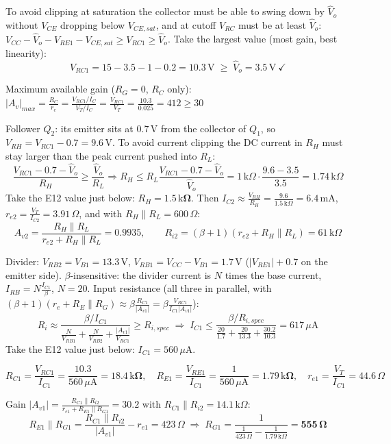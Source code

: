 \documentclass[11pt]{article}
\newcommand{\solstep}[2]{\par\medskip{\color{stepc}\textbf{Step #1 --- #2}}\par\nopagebreak}
\begin{document}
To avoid clipping at saturation the collector must be able to swing down by $\hat V_o$ without $V_{CE}$ dropping below $V_{CE,sat}$, and at cutoff $V_{RC}$ must be at least $\hat V_o$: $V_{CC} - \hat V_o - V_{RE1} - V_{CE,sat} \ge V_{RC1} \ge \hat V_o$. Take the largest value (most gain, best linearity): \[V_{RC1} = 15 - 3.5 - 1 - 0.2 = 10.3\,\mathrm{V} \;\ge\; \hat V_o = 3.5\,\mathrm{V}\ \checkmark\]

Maximum available gain ($R_G=0$, $R_C$ only): $|A_v|_{max} = \frac{R_C}{r_e} = \frac{V_{RC1}/I_C}{V_T/I_C} = \frac{V_{RC1}}{V_T} = \frac{10.3}{0.025} = 412 \ge 30$ \checkmark

Follower $Q_{2}$: its emitter sits at $0.7$\,V from the collector of $Q_{1}$, so $V_{RH} = V_{RC1} - 0.7 = 9.6\,\mathrm{V}$. To avoid current clipping the DC current in $R_H$ must stay larger than the peak current pushed into $R_L$: \[\frac{V_{RC1} - 0.7 - \hat V_o}{R_H} \ge \frac{\hat V_o}{R_L} \Rightarrow R_H \le R_L\frac{V_{RC1} - 0.7 - \hat V_o}{\hat V_o} = 1\,\mathrm{k}\Omega\cdot\frac{9.6 - 3.5}{3.5} = 1.74\,\mathrm{k}\Omega\]Take the E12 value just below: $R_H = \mathbf{1.5\,\mathrm{k}\Omega}$. Then $I_{C2} \approx \frac{V_{RH}}{R_H} = \frac{9.6}{1.5\,\mathrm{k}\Omega} = 6.4\,\mathrm{m}\mathrm{A}$, $r_{e2} = \frac{V_T}{I_{C2}} = 3.91\,\Omega$, and with $R_H \| R_L = 600\,\Omega$:\[A_{v2} = \frac{R_H\|R_L}{r_{e2} + R_H\|R_L} = 0.9935,\qquad R_{i2} = (\beta+1)(r_{e2} + R_H\|R_L) = 61\,\mathrm{k}\Omega\]
\solstep{3}{Bias current and resistors}Divider: $V_{RB2} = V_{B1} = 13.3\,\mathrm{V}$, $V_{RB1} = V_{CC} - V_{B1} = 1.7\,\mathrm{V}$ ($|V_{RE1}| + 0.7$ on the emitter side). $\beta$-insensitive: the divider current is $N$ times the base current, $I_{RB} = N\frac{I_{C1}}{\beta}$, $N = 20$. Input resistance (all three in parallel, with $(\beta+1)(r_e + R_E\|R_G) \approx \beta\frac{R_{C1}}{|A_{v1}|} = \beta\frac{V_{RC1}}{I_{C1}|A_{v1}|}$):\[R_i \approx \frac{\beta/I_{C1}}{\frac{N}{V_{RB1}} + \frac{N}{V_{RB2}} + \frac{|A_{v1}|}{V_{RC1}}} \ge R_{i,spec} \;\Rightarrow\; I_{C1} \le \frac{\beta/R_{i,spec}}{\frac{20}{1.7} + \frac{20}{13.3} + \frac{30.2}{10.3}} = 617\,\mu \mathrm{A}\]Take the E12 value just below: $I_{C1} = 560\,\mu \mathrm{A}$. 

\[R_{C1} = \frac{V_{RC1}}{I_{C1}} = \frac{10.3}{560\,\mu \mathrm{A}} = \mathbf{18.4\,\mathrm{k}\Omega},\quad R_{E1} = \frac{V_{RE1}}{I_{C1}} = \frac{1}{560\,\mu \mathrm{A}} = \mathbf{1.79\,\mathrm{k}\Omega},\quad r_{e1} = \frac{V_T}{I_{C1}} = 44.6\,\Omega\]

Gain $|A_{v1}| = \frac{R_{C1}\|R_{i2}}{r_{e1} + R_{E1}\|R_{G1}} = 30.2$ with $R_{C1}\|R_{i2} = 14.1\,\mathrm{k}\Omega$:\[R_{E1}\|R_{G1} = \frac{R_{C1}\|R_{i2}}{|A_{v1}|} - r_{e1} = 423\,\Omega \;\Rightarrow\; R_{G1} = \frac{1}{\frac{1}{423\,\Omega} - \frac{1}{1.79\,\mathrm{k}\Omega}} = \mathbf{555\,\Omega}\]
\end{document}
